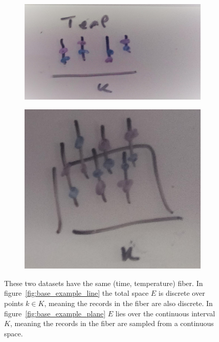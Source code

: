 \documentclass[../main.tex]{subfiles}
\begin{document}
\begin{figure}[ht!]
    \begin{subfigure}{.5\textwidth}
        \includegraphics[width=\textwidth]{figures/math/temp_1k.png}
        \caption{}
        \label{fig:base_example_discrete}
    \end{subfigure}
    \begin{subfigure}{.5\textwidth}
        \includegraphics[width=\textwidth]{figures/math/temp_2k.png}
        \caption{}
        \label{fig:base_example_continuous}
    \end{subfigure}
    \caption{These two datasets have the same (time, temperature) fiber. In figure~\ref{fig:base_example_line} the total space $E$ is discrete over points $k \in K$, meaning the records in the fiber are also discrete. In figure~\ref{fig:base_example_plane} $E$ lies over the continuous interval $K$, meaning the records in the fiber are sampled from a continuous space. 
    }
    \label{fig:base_example}
\end{figure}
\end{document}
